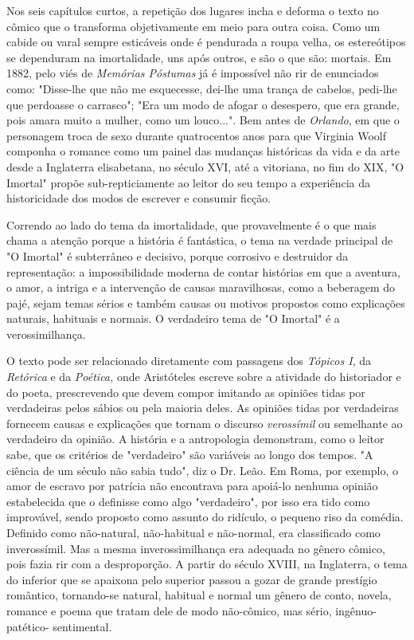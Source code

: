 Nos seis capítulos curtos, a repetição dos lugares incha e deforma o
texto no cômico que o transforma objetivamente em meio para outra coisa.
Como um cabide ou varal sempre esticáveis onde é pendurada a roupa
velha, os estereótipos se dependuram na imortalidade, uns após outros, e
são o que são: mortais. Em 1882, pelo viés de \emph{Memórias Póstumas}
já é impossível não rir de enunciados como: "Disse-lhe que não me
esquecesse, dei-lhe uma trança de cabelos, pedi-lhe que perdoasse o
carrasco"; "Era um modo de afogar o desespero, que era grande, pois
amara muito a mulher, como um louco...". Bem antes de \emph{Orlando}, em
que o personagem troca de sexo durante quatrocentos anos para que
Virginia Woolf componha o romance como um painel das mudanças históricas
da vida e da arte desde a Inglaterra elisabetana, no século XVI, até a
vitoriana, no fim do XIX, "O Imortal" propõe sub-repticiamente ao leitor
do seu tempo a experiência da historicidade dos modos de escrever e
consumir ficção.

Correndo ao lado do tema da imortalidade, que provavelmente é o que mais
chama a atenção porque a história é fantástica, o tema na verdade
principal de "O Imortal" é subterrâneo e decisivo, porque corrosivo e
destruidor da representação: a impossibilidade moderna de contar
histórias em que a aventura, o amor, a intriga e a intervenção de causas
maravilhosas, como a beberagem do pajé, sejam temas sérios e também
causas ou motivos propostos como explicações naturais, habituais e
normais. O verdadeiro tema de "O Imortal" é a verossimilhança.

O texto pode ser relacionado diretamente com passagens dos \emph{Tópicos
I}, da \emph{Retórica} e da \emph{Poética,} onde Aristóteles escreve
sobre a atividade do historiador e do poeta, prescrevendo que devem
compor imitando as opiniões tidas por verdadeiras pelos sábios ou pela
maioria deles. As opiniões tidas por verdadeiras fornecem causas e
explicações que tornam o discurso \emph{verossímil} ou semelhante ao
verdadeiro da opinião. A história e a antropologia demonstram, como o
leitor sabe, que os critérios de "verdadeiro" são variáveis ao longo dos
tempos. "A ciência de um século não sabia tudo", diz o Dr. Leão. Em
Roma, por exemplo, o amor de escravo por patrícia não encontrava para
apoiá-lo nenhuma opinião estabelecida que o definisse como algo
"verdadeiro", por isso era tido como improvável, sendo proposto como
assunto do ridículo, o pequeno riso da comédia. Definido como
não-natural, não-habitual e não-normal, era classificado como
inverossímil. Mas a mesma inverossimilhança era adequada no gênero
cômico, pois fazia rir com a desproporção. A partir do século XVIII, na
Inglaterra, o tema do inferior que se apaixona pelo superior passou a
gozar de grande prestígio romântico, tornando-se natural, habitual e
normal um gênero de conto, novela, romance e poema que tratam dele de
modo não-cômico, mas sério, ingênuo-patético- sentimental.

